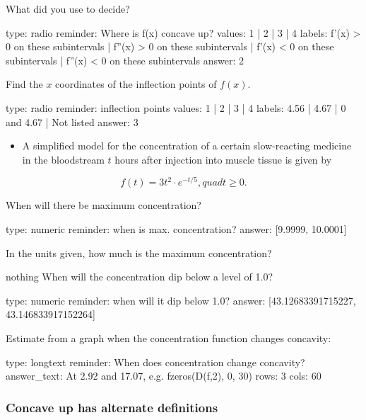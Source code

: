 \documentclass[12pt]{article}
\begin{document}
What did you use to decide?

\begin{answer}
type: radio
reminder: Where is f(x) concave up?
values: 1 | 2 | 3 | 4
labels: f'(x) > 0 on these subintervals | f''(x) > 0 on these subintervals | f'(x) < 0 on these subintervals | f''(x) < 0 on these subintervals
answer: 2
\end{answer}

Find the $x$ coordinates of the inflection points of $f(x)$.

\begin{answer}
type: radio
reminder: inflection points
values: 1 | 2 | 3 | 4
labels: 4.56 | 4.67 | 0 and 4.67 | Not listed
answer: 3
\end{answer}

\begin{itemize}
\itemsep1pt\parskip0pt
\item
  A simplified model for the concentration of a certain slow-reacting
  medicine in the bloodstream $t$ hours after injection into muscle
  tissue is given by
\end{itemize}

\[
f(t) =  3t^2 \cdot e^{-t/5}, quad t \geq 0.
\]

When will there be maximum concentration?

\begin{answer}
    type: numeric
    reminder: when is max. concentration?
    answer: [9.9999, 10.0001]

\end{answer}

In the units given, how much is the maximum concentration?

nothing
When will the concentration dip below a level of 1.0?

\begin{answer}
    type: numeric
    reminder: when will it dip below 1.0?
    answer: [43.12683391715227, 43.146833917152264]

\end{answer}

Estimate from a graph when the concentration function changes concavity:

\begin{answer}
type: longtext
reminder: When does concentration change concavity?
answer_text: At 2.92 and 17.07, e.g. fzeros(D(f,2), 0, 30) 
rows: 3
cols: 60
\end{answer}

\subsubsection{Concave up has alternate definitions}
\end{document}
